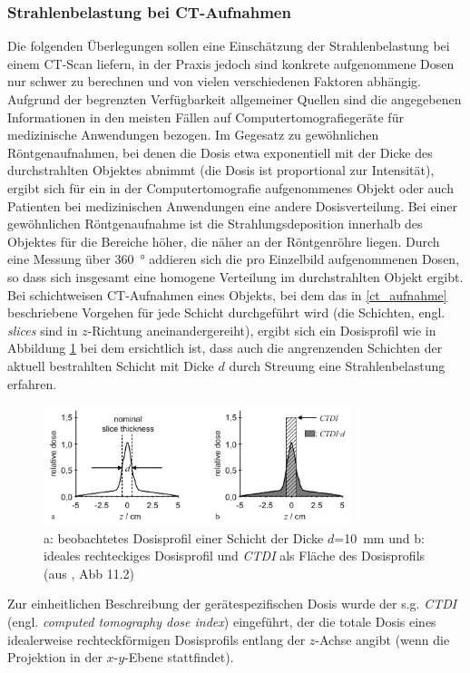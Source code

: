 \documentclass[11pt, a4paper]{article}
\numberwithin{equation}{section}
\begin{document}
\subsubsection{Strahlenbelastung bei CT-Aufnahmen}
Die folgenden Überlegungen sollen eine Einschätzung der Strahlenbelastung bei einem CT-Scan liefern, in der Praxis jedoch sind konkrete aufgenommene Dosen nur schwer zu berechnen und von vielen verschiedenen Faktoren abhängig.
Aufgrund der begrenzten Verfügbarkeit allgemeiner Quellen sind die angegebenen Informationen in den meisten Fällen auf Computertomografiegeräte für medizinische Anwendungen bezogen.
Im Gegesatz zu gewöhnlichen Röntgenaufnahmen, bei denen die Dosis etwa exponentiell mit der Dicke des durchstrahlten Objektes abnimmt (die Dosis ist proportional zur Intensität), ergibt sich für ein in der Computertomografie aufgenommenes Objekt oder auch Patienten bei medizinischen Anwendungen eine andere Dosisverteilung.
Bei einer gewöhnlichen Röntgenaufnahme ist die Strahlungsdeposition innerhalb des Objektes für die Bereiche höher, die näher an der Röntgenröhre liegen. Durch eine Messung über \SI{360}{\degree} addieren sich die pro Einzelbild aufgenommenen Dosen, so dass sich insgesamt eine homogene Verteilung im durchstrahlten Objekt ergibt.
Bei schichtweisen CT-Aufnahmen eines Objekts, bei dem das in \ref{ct_aufnahme} beschriebene Vorgehen für jede Schicht durchgeführt wird (die Schichten, engl. \emph{slices} sind in $z$-Richtung aneinandergereiht), ergibt sich ein Dosisprofil wie in Abbildung \ref{fig:ct_dosisprofil} bei dem ersichtlich ist, dass auch die angrenzenden Schichten der aktuell bestrahlten Schicht mit Dicke $d$ durch Streuung eine Strahlenbelastung erfahren.
\begin{figure}[ht]
	\centering
	\includegraphics[width=0.8\textwidth]{./figures/ct/dosisprofil.png}
	\caption{a: beobachtetes Dosisprofil einer Schicht der Dicke $d$=\SI{10}{mm} und b: ideales rechteckiges Dosisprofil und \emph{CTDI} als Fläche des Dosisprofils (aus \cite{buzug}, Abb 11.2)}
	\label{fig:ct_dosisprofil}
\end{figure}
Zur einheitlichen Beschreibung der gerätespezifischen Dosis wurde der s.g. \emph{CTDI} (engl. \emph{computed tomography dose index}) eingeführt, der die totale Dosis eines idealerweise rechteckförmigen Dosisprofils entlang der $z$-Achse angibt (wenn die Projektion in der $x$-$y$-Ebene stattfindet)\cite{buzug}.
\end{document}
